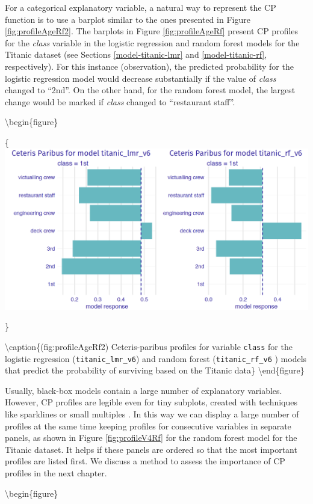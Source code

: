\documentclass[12pt,]{krantz}
\begin{document}
For a categorical explanatory variable, a natural way to represent the CP function is to use a barplot similar to the ones presented in Figure \ref{fig:profileAgeRf2}. The barplots in Figure \ref{fig:profileAgeRf} present CP profiles for the \emph{class} variable in the logistic regression and random forest models for the Titanic dataset (see Sections \ref{model-titanic-lmr} and \ref{model-titanic-rf}, respectively). For this instance (observation), the predicted probability for the logistic regression model would decrease substantially if the value of \emph{class} changed to ``2nd''. On the other hand, for the random forest model, the largest change would be marked if \emph{class} changed to ``restaurant staff''.

\textbackslash{}begin\{figure\}

\{\centering \includegraphics[width=0.7\linewidth]{figure/profile_class_rf}

\}

\textbackslash{}caption\{(fig:profileAgeRf2) Ceteris-paribus profiles for variable \texttt{class} for the logistic regression (\texttt{titanic\_lmr\_v6}) and random forest (\texttt{titanic\_rf\_v6} ) models that predict the probability of surviving based on the Titanic data\}\label{fig:profileAgeRf2}
\textbackslash{}end\{figure\}

Usually, black-box models contain a large number of explanatory variables. However, CP profiles are legible even for tiny subplots, created with techniques like sparklines or small multiples \citep{Tufte1986}. In this way we can display a large number of profiles at the same time keeping profiles for consecutive variables in separate panels, as shown in Figure \ref{fig:profileV4Rf} for the random forest model for the Titanic dataset. It helps if these panels are ordered so that the most important profiles are listed first. We discuss a method to assess the importance of CP profiles in the next chapter.

\textbackslash{}begin\{figure\}
\end{document}

